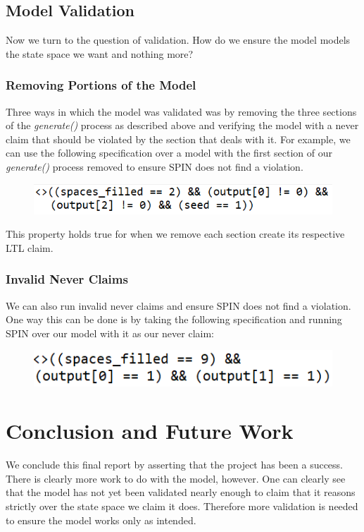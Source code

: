 \documentclass[a4paper]{article}
\begin{document}
\subsection{Model Validation}
Now we turn to the question of validation. How do we ensure the model models the state space we want and nothing more?

\subsubsection{Removing Portions of the Model}
Three ways in which the model was validated was by removing the three sections of the {\it generate()} process as described above and verifying the model with a never claim that should be violated by the section that deals with it. For example, we can use the following specification over a model with the first section of our {\it generate()} process removed to ensure SPIN does not find a violation.

\begin{figure} [h]
\centering
\includegraphics{never_claim_2}
\end{figure}

This property holds true for when we remove each section create its respective LTL claim.

\newpage

\subsubsection{Invalid Never Claims}
We can also run invalid never claims and ensure SPIN does not find a violation. One way this can be done is by taking the following specification and running SPIN over our model with it as our never claim: 

\begin{figure} [h]
\centering
\includegraphics{validation_1}
\end{figure}

\section{Conclusion and Future Work}
We conclude this final report by asserting that the project has been a success. There is clearly more work to do with the model, however. One can clearly see that the model has not yet been validated nearly enough to claim that it reasons strictly over the state space we claim it does. Therefore more validation is needed to ensure the model works only as intended. \\
\end{document}
